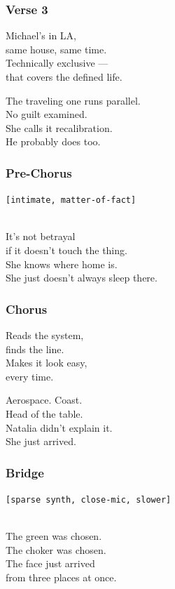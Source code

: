 \subsubsection{Verse 3}\label{verse-3-13}

Michael's in LA,\\
same house, same time.\\
Technically exclusive ---\\
that covers the defined life.

The traveling one runs parallel.\\
No guilt examined.\\
She calls it recalibration.\\
He probably does too.

\subsubsection{Pre-Chorus}\label{pre-chorus-43}

\texttt{{[}intimate,\ matter-of-fact{]}}\strut \\
It's not betrayal\\
if it doesn't touch the thing.\\
She knows where home is.\\
She just doesn't always sleep there.

\subsubsection{Chorus}\label{chorus-57}

Reads the system,\\
finds the line.\\
Makes it look easy,\\
every time.

Aerospace. Coast.\\
Head of the table.\\
Natalia didn't explain it.\\
She just arrived.

\subsubsection{Bridge}\label{bridge-17}

\texttt{{[}sparse\ synth,\ close-mic,\ slower{]}}\strut \\
The green was chosen.\\
The choker was chosen.\\
The face just arrived\\
from three places at once.

